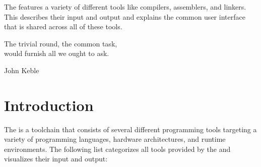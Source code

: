 





{The \ecs{} features a variety of different tools like compilers, assemblers, and linkers.
This \documentation{} describes their input and output and explains the common user interface that is shared across all of these tools.}

\epigraph{The trivial round, the common task, \\ would furnish all we ought to ask.}{John Keble}

\section{Introduction}

The \ecs{} is a toolchain that consists of several different programming tools targeting a variety of programming languages, hardware architectures, and runtime environments.
The following list categorizes all tools provided by the \ecs{} and visualizes their input and output:

